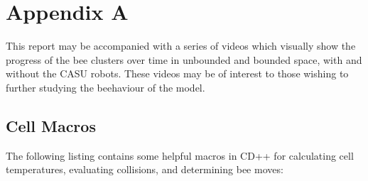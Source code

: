 \documentclass[conference,compsoc,onecolumn]{IEEEtran}
\begin{document}
\section{Appendix A}
This report may be accompanied with a series of videos which visually show the progress of the bee clusters over time in unbounded and bounded space, with and without the CASU robots. These videos may be of interest to those wishing to further studying the beehaviour of the model.

\subsection{Cell Macros}

The following listing contains some helpful macros in CD++ for calculating cell temperatures, evaluating collisions, and determining bee moves:
\end{document}
